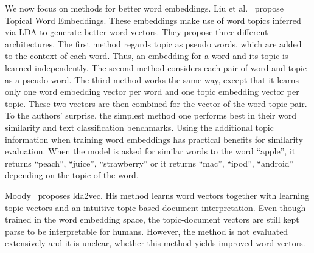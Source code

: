 \documentclass{sig-alternate-05-2015}
\begin{document}
We now focus on methods for better word embeddings.
Liu et al.~\cite{Liu2015} propose Topical Word Embeddings.
These embeddings make use of word topics inferred via LDA to generate better word vectors.
They propose three different architectures.
The first method regards topic as pseudo words, which are added to the context of each word.
Thus, an embedding for a word and its topic is learned independently.
The second method considers each pair of word and topic as a pseudo word.
The third method works the same way, except that it learns only one word embedding vector per word and one topic embedding vector per topic.
These two vectors are then combined for the vector of the word-topic pair.
To the authors' surprise, the simplest method one performs best in their word similarity and text classification benchmarks.
Using the additional topic information when training word embeddings has practical benefits for similarity evaluation.
When the model is asked for similar words to the word ``apple'', it returns ``peach'', ``juice'', ``strawberry'' or it returns ``mac'', ``ipod'', ``android'' depending on the topic of the word.

Moody~\cite{Moody2016} proposes lda2vec.
His method learns word vectors together with learning topic vectors and an intuitive topic-based document interpretation.
Even though trained in the word embedding space, the topic-document vectors are still kept parse to be interpretable for humans.
However, the method is not evaluated extensively and it is unclear, whether this method yields improved word vectors.




\end{document}
